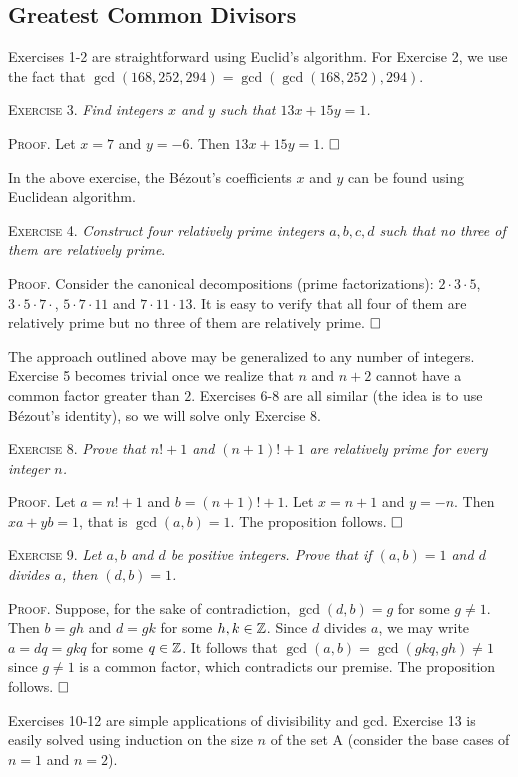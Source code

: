 \documentclass[11pt, leqno]{article}
\newcommand{\done}{\ensuremath{\hfill\square}}
\begin{document}
\subsection{Greatest Common Divisors}

Exercises 1-2 are straightforward using Euclid's algorithm. For Exercise 2, we use the fact that $\gcd(168, 252, 294) = \gcd(\gcd(168, 252), 294)$.

\textsc{Exercise 3}. \emph{Find integers $x$ and $y$ such that $13x + 15y = 1$.}

\textsc{Proof}. Let $x = 7$ and $y = -6$. Then $13x + 15y = 1$. \done

In the above exercise, the B\'ezout's coefficients $x$ and $y$ can be found using Euclidean algorithm.

\textsc{Exercise 4}. \emph{Construct four relatively prime integers $a,b,c,d$ such that no three of them are relatively prime}.

\textsc{Proof}. Consider the canonical decompositions (prime factorizations): $2\cdot3\cdot5$,  $3\cdot5\cdot7\cdot$, $5\cdot7\cdot11$ and $7\cdot11\cdot13$. It is easy to verify that all four of them are relatively prime but no three of them are relatively prime. \done

The approach outlined above may be generalized to any number of integers. Exercise 5 becomes trivial once we realize that $n$ and $n+2$ cannot have a common factor greater than $2$. Exercises 6-8 are all similar (the idea is to use B\'ezout's identity), so we will solve only Exercise 8.

\textsc{Exercise 8}. \emph{Prove that $n!+1$ and $(n+1)!+1$ are relatively prime for every integer $n$.}

\textsc{Proof}. Let $a = n!+1$ and $b = (n+1)!+1$. Let $x = n+1$ and $y = -n$. Then $xa + yb = 1$, that is $\gcd(a,b)=1$. The proposition follows. \done

\textsc{Exercise 9}. \emph{Let $a,b$ and $d$ be positive integers. Prove that if $(a,b)=1$ and $d$ divides $a$, then $(d,b)=1$.}

\textsc{Proof}. Suppose, for the sake of contradiction, $\gcd(d,b) = g$ for some $g\ne 1$. Then $b=gh$ and $d=gk$ for some $h,k \in \mathbb{Z}$. Since $d$ divides $a$, we may write $a = dq = gkq$ for some $q\in\mathbb{Z}$. It follows that $\gcd(a,b) = \gcd(gkq, gh) \ne 1$ since $g\ne 1$ is a common factor, which contradicts our premise. The proposition follows. \done

Exercises 10-12 are simple applications of divisibility and gcd. Exercise 13 is easily solved using induction on the size $n$ of the set A (consider the base cases of $n=1$ and $n=2$).
\end{document}
